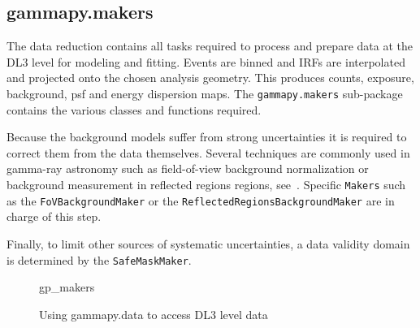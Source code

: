 \subsection{gammapy.makers}
\label{ssec:gammapy-makers}


The data reduction contains all tasks required to process and prepare data at the DL3
level for modeling and fitting. Events are binned and IRFs are interpolated and
projected onto the chosen analysis geometry. This produces counts, exposure, background, psf
and energy dispersion maps.
The {\tt gammapy.makers} sub-package contains the various classes and functions required.

Because the background models suffer from strong uncertainties it is required to correct
them from the data themselves. Several techniques are commonly used in gamma-ray astronomy
such as field-of-view background normalization or background measurement in reflected regions 
regions, see~\cite{Berge07}. Specific {\tt Makers} such as the {\tt FoVBackgroundMaker} or the
{\tt ReflectedRegionsBackgroundMaker} are in charge of this step.

Finally, to limit other sources of systematic uncertainties, a data validity domain is
determined by the {\tt SafeMaskMaker}.



\begin{figure}
	{gp_makers}

	\caption{Using gammapy.data to access DL3 level data}
	\label{ig*:minted:gp_makers}
\end{figure}

